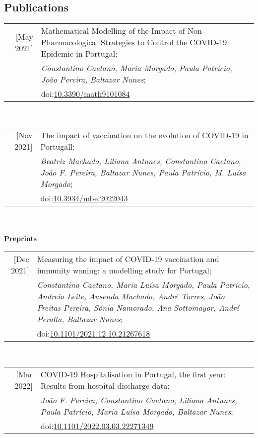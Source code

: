 \documentclass[11pt,oneside,a4paper,titlepage]{article}
\begin{document}
\subsection{  Publications}
\begin{tabular}{N P}
[May 2021] & Mathematical Modelling of the Impact of Non-Pharmacological Strategies to Control the COVID-19 Epidemic in Portugal;\\
& \textit{Constantino Caetano, Maria Morgado, Paula Patrício, João Pereira, Baltazar Nunes};\\
& doi:\href{https://doi.org/10.3390/math9101084}{10.3390/math9101084}\\
\end{tabular}
\\
\begin{tabular}{N P}
[Nov 2021] & The impact of vaccination on the evolution of COVID-19 in Portugall;\\
& \textit{Beatriz Machado, Liliana Antunes, Constantino Caetano, João F. Pereira, Baltazar Nunes, Paula Patrício, M. Luísa Morgado};\\
& doi:\href{https://doi.org/10.3934/mbe.2022043}{10.3934/mbe.2022043}\\
\end{tabular}
\\
\\
\textcolor{textGrey}{\textbf{Preprints}}
\\
\begin{tabular}{N P}
[Dec 2021] & Measuring the impact of COVID-19 vaccination and immunity waning: a modelling study for Portugal;\\
& \textit{Constantino Caetano, Maria Luísa Morgado, Paula Patrício, Andreia Leite, Ausenda Machado, André Torres, João Freitas Pereira, Sónia Namorado, Ana Sottomayor, André Peralta, Baltazar Nunes};\\
& doi:\href{https://doi.org/10.1101/2021.12.10.21267618}{10.1101/2021.12.10.21267618}\\
\end{tabular}
\\
\begin{tabular}{N P}
[Mar 2022] & COVID-19 Hospitalisation in Portugal, the first year: Results from hospital discharge data;\\
& \textit{João F. Pereira, Constantino Caetano, Liliana Antunes, Paula Patrício, Maria Luísa Morgado, Baltazar Nunes};\\
& doi:\href{https://doi.org/10.1101/2022.03.03.22271349}{10.1101/2022.03.03.22271349}\\
\end{tabular}
\end{document}
